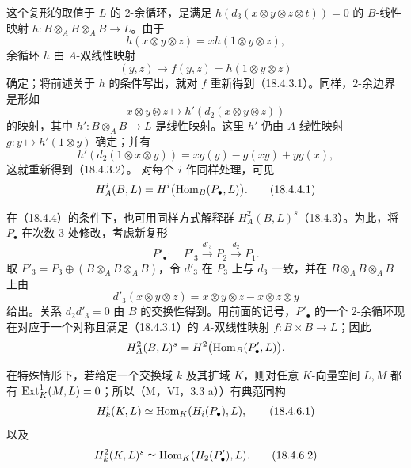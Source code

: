 这个复形的取值于 $L$ 的 $2$-余循环，是满足 $h(d_3(x\otimes y\otimes z\otimes t))=0$ 的 $B$-线性映射 $h:B\otimes_AB\otimes_AB\to L$。由于
\[
 h(x\otimes y\otimes z)=xh(1\otimes y\otimes z),
\]
余循环 $h$ 由 $A$-双线性映射
\[
 (y,z)\longmapsto f(y,z)=h(1\otimes y\otimes z)
\]
确定；将前述关于 $h$ 的条件写出，就对 $f$ 重新得到（18.4.3.1）。同样，$2$-余边界是形如
\[
 x\otimes y\otimes z\longmapsto h'(d_2(x\otimes y\otimes z))
\]
的映射，其中 $h':B\otimes_AB\to L$ 是线性映射。这里 $h'$ 仍由 $A$-线性映射 $g:y\mapsto h'(1\otimes y)$ 确定；并有
\[
 h'(d_2(1\otimes x\otimes y))=xg(y)-g(xy)+yg(x),
\]
这就重新得到（18.4.3.2）。
对每个 $i$ 作同样处理，可见
\begin{equation}
 H_A^i(B,L)=H^i\bigl(\operatorname{Hom}_B(P_\bullet,L)\bigr).
 \tag{18.4.4.1}
\end{equation}

在（18.4.4）的条件下，也可用同样方式解释群 $H_A^2(B,L)^s$（18.4.3）。为此，将 $P_\bullet$ 在次数 $3$ 处修改，考虑新复形
\[
 P'_\bullet:\quad P'_3\xrightarrow{d'_3}P_2\xrightarrow{d_2}P_1.
\]
取 $P'_3=P_3\oplus(B\otimes_AB\otimes_AB)$，令 $d'_3$ 在 $P_3$ 上与 $d_3$ 一致，并在 $B\otimes_AB\otimes_AB$ 上由
\[
 d'_3(x\otimes y\otimes z)=x\otimes y\otimes z-x\otimes z\otimes y
\]
给出。关系 $d_2d'_3=0$ 由 $B$ 的交换性得到。用前面的记号，$P'_\bullet$ 的一个 $2$-余循环现在对应于一个对称且满足（18.4.3.1）的 $A$-双线性映射 $f:B\times B\to L$；因此
\[
 H_A^2(B,L)^s=H^2\bigl(\operatorname{Hom}_B(P'_\bullet,L)\bigr).
\]

在特殊情形下，若给定一个交换域 $k$ 及其扩域 $K$，则对任意 $K$-向量空间 $L,M$ 都有 $\operatorname{Ext}_K^1(M,L)=0$；所以（M，VI，3.3 a））有典范同构
\begin{equation}
 H_k^i(K,L)\simeq\operatorname{Hom}_K(H_i(P_\bullet),L),
 \tag{18.4.6.1}
\end{equation}
以及
\begin{equation}
 H_k^2(K,L)^s\simeq\operatorname{Hom}_K(H_2(P'_\bullet),L).
 \tag{18.4.6.2}
\end{equation}
